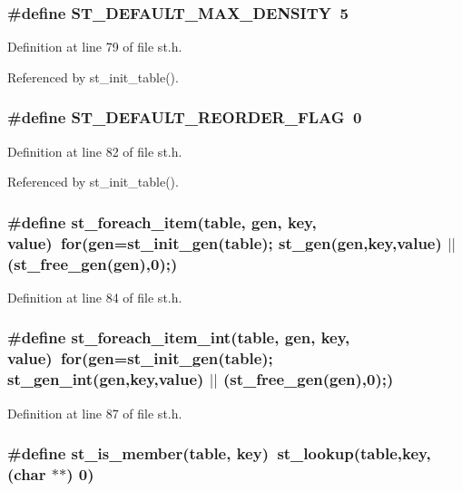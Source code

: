 \subsubsection{\setlength{\rightskip}{0pt plus 5cm}\#define ST\_\-DEFAULT\_\-MAX\_\-DENSITY~5}\label{st_8h_4f884be75490db2c92e409a0209fdbcb}




Definition at line 79 of file st.h.

Referenced by st\_\-init\_\-table().
\subsubsection{\setlength{\rightskip}{0pt plus 5cm}\#define ST\_\-DEFAULT\_\-REORDER\_\-FLAG~0}\label{st_8h_933aaa48b6a156a000befde073a24e4c}




Definition at line 82 of file st.h.

Referenced by st\_\-init\_\-table().
\subsubsection{\setlength{\rightskip}{0pt plus 5cm}\#define st\_\-foreach\_\-item(table, gen, key, value)~for(gen=st\_\-init\_\-gen(table); st\_\-gen(gen,key,value) $|$$|$ (st\_\-free\_\-gen(gen),0);)}\label{st_8h_ea51027ca2b7197709990fb086e12c2c}




Definition at line 84 of file st.h.
\subsubsection{\setlength{\rightskip}{0pt plus 5cm}\#define st\_\-foreach\_\-item\_\-int(table, gen, key, value)~for(gen=st\_\-init\_\-gen(table); st\_\-gen\_\-int(gen,key,value) $|$$|$ (st\_\-free\_\-gen(gen),0);)}\label{st_8h_437227772bc9c4c0ec636f5723654a4c}




Definition at line 87 of file st.h.
\subsubsection{\setlength{\rightskip}{0pt plus 5cm}\#define st\_\-is\_\-member(table, key)~st\_\-lookup(table,key,(char $\ast$$\ast$) 0)}\label{st_8h_3e18b4a4f91b4188aa376a15ca372b9c}




